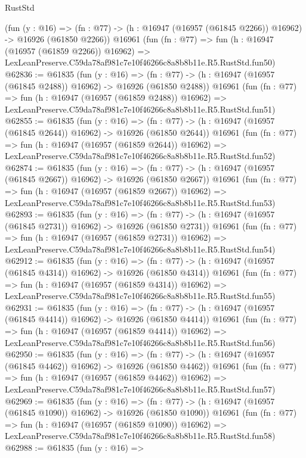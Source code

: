 \begin{lexlean}{RustStd}
\begin{coremodule}
    (fun (y : @16) =>
    (fn : @77) -> (h : @16947 (@16957 (@61845 @2266)) @16962) -> @16926 (@61850 @2266))
    @16961
    (fun (fn : @77) =>
    fun (h : @16947 (@16957 (@61859 @2266)) @16962) =>
    LexLeanPreserve.C59da78af981c7e10f46266c8a8b8b11e.R5.RustStd.fun50)
@62836 := @61835
    (fun (y : @16) =>
    (fn : @77) -> (h : @16947 (@16957 (@61845 @2488)) @16962) -> @16926 (@61850 @2488))
    @16961
    (fun (fn : @77) =>
    fun (h : @16947 (@16957 (@61859 @2488)) @16962) =>
    LexLeanPreserve.C59da78af981c7e10f46266c8a8b8b11e.R5.RustStd.fun51)
@62855 := @61835
    (fun (y : @16) =>
    (fn : @77) -> (h : @16947 (@16957 (@61845 @2644)) @16962) -> @16926 (@61850 @2644))
    @16961
    (fun (fn : @77) =>
    fun (h : @16947 (@16957 (@61859 @2644)) @16962) =>
    LexLeanPreserve.C59da78af981c7e10f46266c8a8b8b11e.R5.RustStd.fun52)
@62874 := @61835
    (fun (y : @16) =>
    (fn : @77) -> (h : @16947 (@16957 (@61845 @2667)) @16962) -> @16926 (@61850 @2667))
    @16961
    (fun (fn : @77) =>
    fun (h : @16947 (@16957 (@61859 @2667)) @16962) =>
    LexLeanPreserve.C59da78af981c7e10f46266c8a8b8b11e.R5.RustStd.fun53)
@62893 := @61835
    (fun (y : @16) =>
    (fn : @77) -> (h : @16947 (@16957 (@61845 @2731)) @16962) -> @16926 (@61850 @2731))
    @16961
    (fun (fn : @77) =>
    fun (h : @16947 (@16957 (@61859 @2731)) @16962) =>
    LexLeanPreserve.C59da78af981c7e10f46266c8a8b8b11e.R5.RustStd.fun54)
@62912 := @61835
    (fun (y : @16) =>
    (fn : @77) -> (h : @16947 (@16957 (@61845 @4314)) @16962) -> @16926 (@61850 @4314))
    @16961
    (fun (fn : @77) =>
    fun (h : @16947 (@16957 (@61859 @4314)) @16962) =>
    LexLeanPreserve.C59da78af981c7e10f46266c8a8b8b11e.R5.RustStd.fun55)
@62931 := @61835
    (fun (y : @16) =>
    (fn : @77) -> (h : @16947 (@16957 (@61845 @4414)) @16962) -> @16926 (@61850 @4414))
    @16961
    (fun (fn : @77) =>
    fun (h : @16947 (@16957 (@61859 @4414)) @16962) =>
    LexLeanPreserve.C59da78af981c7e10f46266c8a8b8b11e.R5.RustStd.fun56)
@62950 := @61835
    (fun (y : @16) =>
    (fn : @77) -> (h : @16947 (@16957 (@61845 @4462)) @16962) -> @16926 (@61850 @4462))
    @16961
    (fun (fn : @77) =>
    fun (h : @16947 (@16957 (@61859 @4462)) @16962) =>
    LexLeanPreserve.C59da78af981c7e10f46266c8a8b8b11e.R5.RustStd.fun57)
@62969 := @61835
    (fun (y : @16) =>
    (fn : @77) -> (h : @16947 (@16957 (@61845 @1090)) @16962) -> @16926 (@61850 @1090))
    @16961
    (fun (fn : @77) =>
    fun (h : @16947 (@16957 (@61859 @1090)) @16962) =>
    LexLeanPreserve.C59da78af981c7e10f46266c8a8b8b11e.R5.RustStd.fun58)
@62988 := @61835
    (fun (y : @16) =>

\end{coremodule}
\end{lexlean}
